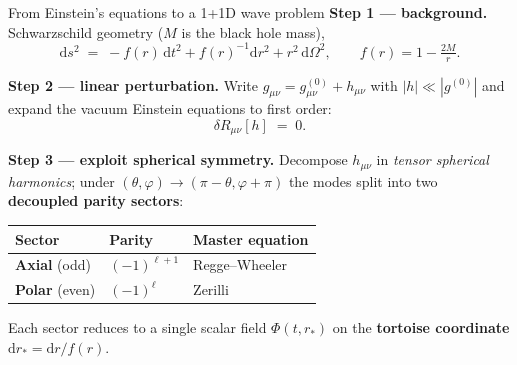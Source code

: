 \documentclass[aspectratio=169, 11pt]{beamer}
\newcommand{\bh}{black hole}
\newcommand{\rw}{Regge--Wheeler}
\newcommand{\zer}{Zerilli}
\begin{document}
\begin{frame}{From Einstein's equations to a 1+1D wave problem}
  \textbf{Step 1 --- background.} Schwarzschild geometry ($M$ is the \bh{} mass),
  \[
    \mathrm{d} s^{2} \;=\; -f(r)\,\mathrm{d} t^{2} + f(r)^{-1}\mathrm{d} r^{2}
                     + r^{2}\,\mathrm{d}\Omega^{2},
    \qquad f(r) = 1 - \tfrac{2M}{r}.
  \]

  \textbf{Step 2 --- linear perturbation.} Write
  $g_{\mu\nu} = g^{(0)}_{\mu\nu} + h_{\mu\nu}$ with $|h| \ll |g^{(0)}|$ and
  expand the vacuum Einstein equations to first order:
  \[
    \delta R_{\mu\nu}[h] \;=\; 0 .
  \]

  \textbf{Step 3 --- exploit spherical symmetry.} Decompose $h_{\mu\nu}$ in
  \emph{tensor spherical harmonics}; under $(\theta,\varphi)\!\to\!(\pi-\theta,\varphi+\pi)$
  the modes split into two \textbf{decoupled parity sectors}:
  \medskip
  \begin{center}\small
  \begin{tabular}{lll}
    \toprule
    Sector & Parity & Master equation \\ \midrule
    \textbf{Axial} (odd) & $(-1)^{\ell+1}$ & \rw{} \\
    \textbf{Polar} (even)& $(-1)^{\ell}$   & \zer{} \\
    \bottomrule
  \end{tabular}
  \end{center}
  \medskip
  Each sector reduces to a single scalar field $\Phi(t,r_{\!*})$ on the
  \textbf{tortoise coordinate} $\mathrm{d} r_{\!*} = \mathrm{d} r/f(r)$.
\end{frame}
\end{document}
